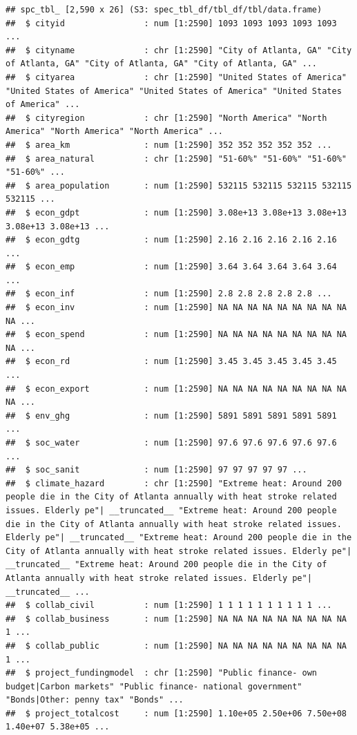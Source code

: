 \documentclass[
]{article}
\begin{document}
\begin{verbatim}
## spc_tbl_ [2,590 x 26] (S3: spec_tbl_df/tbl_df/tbl/data.frame)
##  $ cityid                : num [1:2590] 1093 1093 1093 1093 1093 ...
##  $ cityname              : chr [1:2590] "City of Atlanta, GA" "City of Atlanta, GA" "City of Atlanta, GA" "City of Atlanta, GA" ...
##  $ cityarea              : chr [1:2590] "United States of America" "United States of America" "United States of America" "United States of America" ...
##  $ cityregion            : chr [1:2590] "North America" "North America" "North America" "North America" ...
##  $ area_km               : num [1:2590] 352 352 352 352 352 ...
##  $ area_natural          : chr [1:2590] "51-60%" "51-60%" "51-60%" "51-60%" ...
##  $ area_population       : num [1:2590] 532115 532115 532115 532115 532115 ...
##  $ econ_gdpt             : num [1:2590] 3.08e+13 3.08e+13 3.08e+13 3.08e+13 3.08e+13 ...
##  $ econ_gdtg             : num [1:2590] 2.16 2.16 2.16 2.16 2.16 ...
##  $ econ_emp              : num [1:2590] 3.64 3.64 3.64 3.64 3.64 ...
##  $ econ_inf              : num [1:2590] 2.8 2.8 2.8 2.8 2.8 ...
##  $ econ_inv              : num [1:2590] NA NA NA NA NA NA NA NA NA NA ...
##  $ econ_spend            : num [1:2590] NA NA NA NA NA NA NA NA NA NA ...
##  $ econ_rd               : num [1:2590] 3.45 3.45 3.45 3.45 3.45 ...
##  $ econ_export           : num [1:2590] NA NA NA NA NA NA NA NA NA NA ...
##  $ env_ghg               : num [1:2590] 5891 5891 5891 5891 5891 ...
##  $ soc_water             : num [1:2590] 97.6 97.6 97.6 97.6 97.6 ...
##  $ soc_sanit             : num [1:2590] 97 97 97 97 97 ...
##  $ climate_hazard        : chr [1:2590] "Extreme heat: Around 200 people die in the City of Atlanta annually with heat stroke related issues. Elderly pe"| __truncated__ "Extreme heat: Around 200 people die in the City of Atlanta annually with heat stroke related issues. Elderly pe"| __truncated__ "Extreme heat: Around 200 people die in the City of Atlanta annually with heat stroke related issues. Elderly pe"| __truncated__ "Extreme heat: Around 200 people die in the City of Atlanta annually with heat stroke related issues. Elderly pe"| __truncated__ ...
##  $ collab_civil          : num [1:2590] 1 1 1 1 1 1 1 1 1 1 ...
##  $ collab_business       : num [1:2590] NA NA NA NA NA NA NA NA NA 1 ...
##  $ collab_public         : num [1:2590] NA NA NA NA NA NA NA NA NA 1 ...
##  $ project_fundingmodel  : chr [1:2590] "Public finance- own budget|Carbon markets" "Public finance- national government" "Bonds|Other: penny tax" "Bonds" ...
##  $ project_totalcost     : num [1:2590] 1.10e+05 2.50e+06 7.50e+08 1.40e+07 5.38e+05 ...

\end{verbatim}
\end{document}
